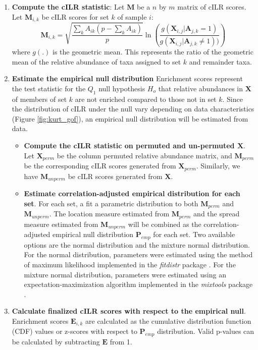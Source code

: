 \documentclass[10pt,letterpaper]{article}
\begin{document}
\begin{enumerate}
    \item \textbf{Compute the cILR statistic}: Let $\mathbf{M}$ be a $n$ by $m$ matrix of cILR scores. Let $\mathbf{M}_{i,k}$ be cILR scores for set $k$ of sample $i$:   
    \begin{equation}\label{main_eq}
        \mathbf{M}_{i,k} = \sqrt{\frac{\sum_k A_{ik}(p - \sum_k A_{ik})}{p}} \ln \left( \frac{g(\mathbf{X}_{i,j}|\mathbf{A}_{j,k} = 1)}{g(\mathbf{X}_{i,j}|\mathbf{A}_{j,k} \neq 1))} \right)
    \end{equation}
    where $g(.)$ is the geometric mean. This represents the ratio of the geometric mean of the relative abundance of taxa assigned to set $k$ and remainder taxa. 
    \item \textbf{Estimate the empirical null distribution} Enrichment scores represent the test statistic for the $Q_1$ null hypothesis $H_o$ that relative abundances in $\mathbf{X}$ of members of set $k$ are not enriched compared to those not in set $k$. Since the distribution of cILR under the null vary depending on data characteristics (Figure \ref{fig:kurt_gof}), an empirical null distribution will be estimated from data.
    \begin{itemize}
        \item \textbf{Compute the cILR statistic on permuted and un-permuted $\mathbf{X}$}.  Let $\mathbf{X}_{perm}$ be the column permuted relative abundance matrix, and $\mathbf{M}_{perm}$ be the corresponding cILR scores generated from $\mathbf{X}_{perm}$. Similarly, we have $\mathbf{M}_{unperm}$ be cILR scores generated from $\mathbf{X}$.
        \item \textbf{Estimate correlation-adjusted empirical distribution for each set}. For each set, a fit a parametric distribution to both $\mathbf{M}_{perm}$ and $\mathbf{M}_{unperm}$. The location measure estimated from $\mathbf{M}_{perm}$ and the spread measure estimated from $\mathbf{M}_{unperm}$ will be combined as the correlation-adjusted empirical null distribution $\mathbf{P}_{emp}$ for each set. Two available options are the normal distribution and the mixture normal distribution. For the normal distribution, parameters were estimated using the method of maximum likelihood implemented in the \emph{fitdistr} package \cite{delignette-muller2015}. For the mixture normal distribution, parameters were estimated using an expectation-maximization algorithm implemented in the \emph{mixtools} package \cite{benaglia2009}. 
    \end{itemize}
    \item \textbf{Calculate finalized cILR scores with respect to the empirical null}. Enrichment scores $\mathbf{E}_{i,k}$ are calculated as the cumulative distribution function (CDF) values or z-scores with respect to $\mathbf{P}_{emp}$ distribution. Valid p-values can be calculated by subtracting $\mathbf{E}$ from 1. 
\end{enumerate}
\end{document}
